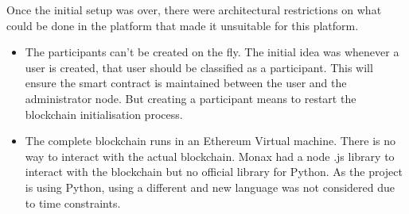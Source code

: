 Once the initial setup was over, there were architectural restrictions on what could be done in the platform that made it unsuitable for this platform. 
\begin{itemize}
    \item The participants can't be created on the fly. The initial idea was whenever a user is created, that user should be classified as a participant. This will ensure the smart contract is maintained between the user and the administrator node. But creating a participant means to restart the blockchain initialisation process.
    \item The complete blockchain runs in an Ethereum Virtual machine. There is no way to interact with the actual blockchain. Monax had a node .js library to interact with the blockchain but no official library for Python. As the project is using Python, using a different and new language was not considered due to time constraints.
\end{itemize}

